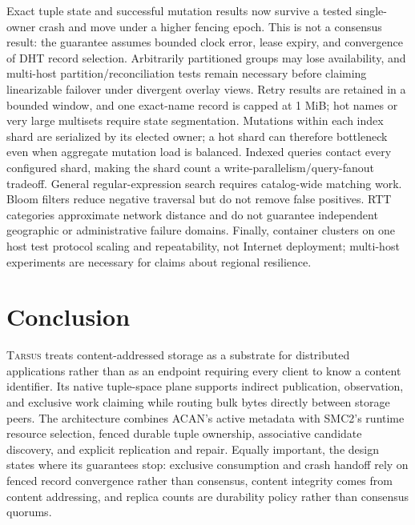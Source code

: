 \documentclass[conference]{IEEEtran}
\newcommand{\system}{\textsc{Tarsus}\xspace}
\begin{document}
Exact tuple state and successful mutation results now survive a tested
single-owner crash and move under a higher fencing epoch. This is not a
consensus result: the guarantee assumes bounded clock error, lease expiry, and
convergence of DHT record selection. Arbitrarily partitioned groups may lose
availability, and multi-host partition/reconciliation tests remain necessary
before claiming linearizable failover under divergent overlay views. Retry
results are retained in a bounded window, and one exact-name record is capped
at 1 MiB; hot names or very large multisets require state segmentation.
Mutations within each index shard are serialized by its elected
owner; a hot shard can therefore bottleneck even when aggregate mutation load
is balanced. Indexed queries contact every configured shard, making the shard
count a write-parallelism/query-fanout tradeoff. General regular-expression
search requires catalog-wide matching work.
Bloom filters reduce negative traversal but do not remove false positives.
RTT categories approximate network distance and do not guarantee independent
geographic or administrative failure domains. Finally, container clusters on
one host test protocol scaling and repeatability, not Internet deployment;
multi-host experiments are necessary for claims about regional resilience.

\section{Conclusion}

\system treats content-addressed storage as a substrate for distributed
applications rather than as an endpoint requiring every client to know a
content identifier. Its native tuple-space plane supports indirect publication,
observation, and exclusive work claiming while routing bulk bytes directly
between storage peers. The architecture combines ACAN's active metadata with
SMC2's runtime resource selection, fenced durable tuple ownership, associative
candidate discovery, and explicit replication and repair. Equally important,
the design states where its guarantees stop: exclusive consumption and crash
handoff rely on fenced record convergence rather than consensus, content
integrity comes from content addressing, and replica counts are durability
policy rather than consensus quorums.
\end{document}

